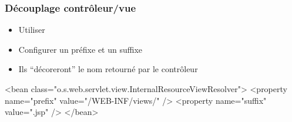 \begin{frame}[fragile]
 \frametitle{Découplage contrôleur/vue}

 \begin{itemize}
  \item Utiliser 
  \item Configurer un préfixe et un suffixe
  \item Ils ``décoreront'' le nom retourné par le contrôleur
 \end{itemize}

 \begin{xmlcode}
<bean class="o.s.web.servlet.view.InternalResourceViewResolver">
  <property name="prefix" value="/WEB-INF/views/" />
  <property name="suffix" value=".jsp" />
</bean>
 \end{xmlcode}

\end{frame}
